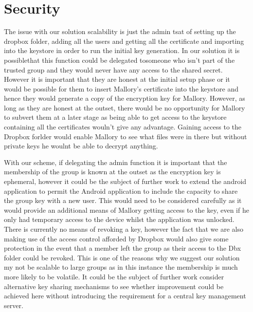 
\chapter{Security}
\label{cha:security}
The issue with our solution scalability is just the admin tsat of setting up the dropbox folder, adding all the users and getting all the certificate and importing into the keystore in order to run the initial key generation.  In our solution it is possiblethat this function could be delegated tosomeone who isn’t part of the trusted group and they would never have any access to the shared secret.  However it is important that they are honest at the initial setup phase or it would be possible for them to insert Mallory’s certificate into the keystore and hence they would generate a copy of the encryption key for Mallory.  However, as long as they are honest at the outset, there would be no opportunity for Mallory to subvert them at a later stage as being able to get access to the keystore containing all the certificates wouln’t give any advantage.  Gaining access to the Dropbox forlder would enable Mallory to see what files were in there but without private keys he woulnt be able to decrypt anything.



With our scheme, if delegating the admin function it is important that the membership of the group is known at the outset as the encryption key is ephemeral, however it could be the subject of further work to extend the android application to permit the Android application to include the capacity to share the group key with a new user.  This would need to be considered carefully as it would provide an additional means of Mallory getting access to the key, even if he only had temporary access to the device whilst the application was unlocked.  There is currently no means of revoking a key, however the fact that we are also making use of the access control afforded by Dropbox would also give some protection in the event that a member left the group as their access to the Dbx folder could be revoked.  This is one of the reasons why we suggest our solution my not be scalable to large groups as in this instance the membership is much more likely to be volatile.  It could be the subject of further work consider alternative key sharing mechanisms to see whether improvement could be achieved here without introducing the requirement for a central key management server.



